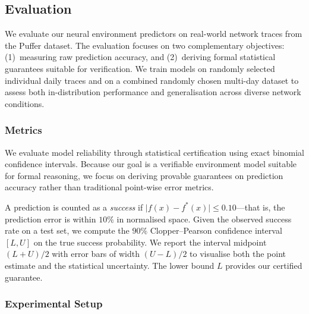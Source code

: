 \documentclass[thesis]{uofithesis} %
\begin{document}
    \subsection{Evaluation}
    \label{sec:env-eval}

    We evaluate our neural environment predictors on real-world network
    traces from the Puffer dataset.  The evaluation focuses on two
    complementary objectives: (1)~measuring raw prediction accuracy, and
    (2)~deriving formal statistical guarantees suitable for verification.
    We train models on randomly selected individual daily traces and on a 
    combined randomly chosen multi-day
    dataset to assess both in-distribution performance and generalisation
    across diverse network conditions.


    \subsubsection{Metrics}
    \label{sec:env-metrics}

    We evaluate model reliability through statistical certification using
    exact binomial confidence intervals.  Because our goal is a verifiable
    environment model suitable for formal reasoning, we focus on deriving
    provable guarantees on prediction accuracy rather than traditional
    point-wise error metrics.

    A prediction is counted as a \emph{success} if
    $\lvert f(x) - f^{\ast}(x) \rvert \leq 0.10$---that is, the
    prediction error is within $10\%$ in normalised space.  Given the
    observed success rate on a test set, we compute the $90\%$
    Clopper--Pearson confidence interval $[L, U]$ on the true success
    probability.  We report the interval midpoint $(L + U)/2$ with error
    bars of width $(U - L)/2$ to visualise both the point estimate and the
    statistical uncertainty.  The lower bound $L$ provides our certified
    guarantee.


    \subsubsection{Experimental Setup}
    \label{sec:env-setup}
\end{document}
